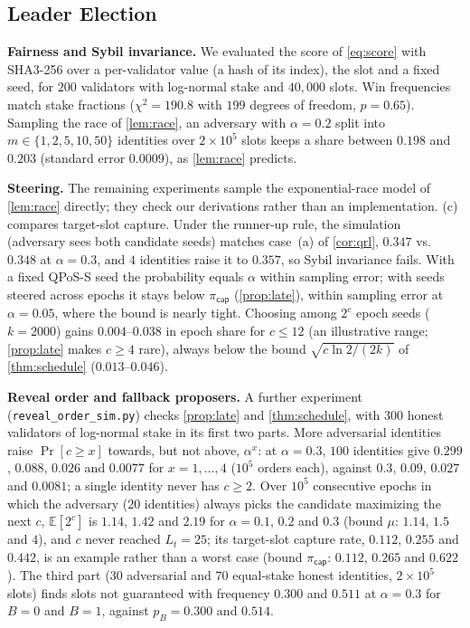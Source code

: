 \documentclass[10pt,journal,compsoc]{IEEEtran}
\theoremstyle{tplain}
\theoremstyle{tdef}
\theoremstyle{remark}
\begin{document}
\subsection{Leader Election}\label{sec:eval-leader}
\noindent\textbf{Fairness and Sybil invariance.} We evaluated the score of \cref{eq:score} with SHA3-256 over a per-validator value (a hash of its index), the slot and a fixed seed, for $200$ validators with log-normal stake and $40{,}000$ slots. Win frequencies match stake fractions ($\chi^2=190.8$ with $199$ degrees of freedom, $p=0.65$). Sampling the race of \cref{lem:race}, an adversary with $\alpha=0.2$ split into $m\in\{1,2,5,10,50\}$ identities over $2\times10^5$ slots keeps a share between $0.198$ and $0.203$ (standard error $0.0009$), as \cref{lem:race} predicts.

\noindent\textbf{Steering.} The remaining experiments sample the exponential-race model of \cref{lem:race} directly; they check our derivations rather than an implementation. (c) compares target-slot capture. Under the runner-up rule, the simulation (adversary sees both candidate seeds) matches case~(a) of \cref{cor:qrl}, $0.347$ vs.\ $0.348$ at $\alpha=0.3$, and $4$ identities raise it to $0.357$, so Sybil invariance fails. With a fixed QPoS-S seed the probability equals $\alpha$ within sampling error; with seeds steered across epochs it stays below $\pi_{\mathsf{cap}}$ (\cref{prop:late}), within sampling error at $\alpha=0.05$, where the bound is nearly tight. Choosing among $2^c$ epoch seeds ($k=2000$) gains $0.004$--$0.038$ in epoch share for $c\le 12$ (an illustrative range; \cref{prop:late} makes $c\ge4$ rare), always below the bound $\sqrt{c\ln 2/(2k)}$ of \cref{thm:schedule} ($0.013$--$0.046$).

\noindent\textbf{Reveal order and fallback proposers.} A further experiment (\texttt{reveal\_order\_sim.py}) checks \cref{prop:late} and \cref{thm:schedule}, with $300$ honest validators of log-normal stake in its first two parts. More adversarial identities raise $\Pr[c\ge x]$ towards, but not above, $\alpha^x$: at $\alpha=0.3$, $100$ identities give $0.299$, $0.088$, $0.026$ and $0.0077$ for $x=1,\dots,4$ ($10^5$ orders each), against $0.3$, $0.09$, $0.027$ and $0.0081$; a single identity never has $c\ge2$. Over $10^5$ consecutive epochs in which the adversary ($20$ identities) always picks the candidate maximizing the next $c$, $\mathbb E[2^c]$ is $1.14$, $1.42$ and $2.19$ for $\alpha=0.1$, $0.2$ and $0.3$ (bound $\mu$: $1.14$, $1.5$ and $4$), and $c$ never reached $L_t=25$; its target-slot capture rate, $0.112$, $0.255$ and $0.442$, is an example rather than a worst case (bound $\pi_{\mathsf{cap}}$: $0.112$, $0.265$ and $0.622$). The third part ($30$ adversarial and $70$ equal-stake honest identities, $2\times10^5$ slots) finds slots not guaranteed with frequency $0.300$ and $0.511$ at $\alpha=0.3$ for $B=0$ and $B=1$, against $p_B=0.300$ and $0.514$.
\end{document}
